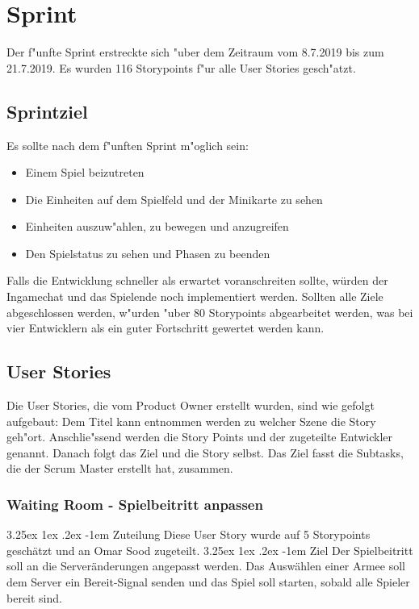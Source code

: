 \documentclass[12pt, titlepage]{scrartcl}
\makeatletter
\newcommand{\RN}[1]{%
	\textup{\uppercase\expandafter{\romannumeral#1}}%
}
\renewcommand\paragraph{\@startsection{paragraph}{5}{\z@}%
  {3.25ex \@plus1ex \@minus.2ex}%
  {-1em}%
  {\normalfont\normalsize\bfseries}}
\makeatother
\begin{document}
	\section{Sprint \RN{5}}
	    Der f"unfte Sprint erstreckte sich "uber dem Zeitraum vom 8.7.2019 bis zum 21.7.2019. Es wurden 116 Storypoints f"ur alle User Stories gesch"atzt.
	    \subsection{Sprintziel} \label{Sprintgoal_5}
	        Es sollte nach dem f"unften Sprint m"oglich sein:
	        \begin{itemize}
	            \item Einem Spiel beizutreten
	            \item Die Einheiten auf dem Spielfeld und der Minikarte zu sehen
	            \item Einheiten auszuw"ahlen, zu bewegen und anzugreifen
	            \item Den Spielstatus zu sehen und Phasen zu beenden
	        \end{itemize}
	        Falls die Entwicklung schneller als erwartet voranschreiten sollte, würden der Ingamechat und das Spielende noch implementiert werden. Sollten alle Ziele abgeschlossen werden, w"urden "uber 80 Storypoints abgearbeitet werden, was bei vier Entwicklern als ein guter Fortschritt gewertet werden kann.
	    \subsection{User Stories} \label{User_Stories_5}
	        Die User Stories, die vom Product Owner erstellt wurden, sind wie gefolgt aufgebaut: Dem Titel kann entnommen werden zu welcher Szene die Story geh"ort. Anschlie"ssend werden die Story Points und der zugeteilte Entwickler genannt. Danach folgt das Ziel und die Story selbst. Das Ziel fasst die Subtasks, die der Scrum Master erstellt hat, zusammen.
	        \subsubsection{Waiting Room - Spielbeitritt anpassen}
	            \paragraph{Zuteilung}
	                Diese User Story wurde auf 5 Storypoints gesch\"atzt und an Omar Sood zugeteilt.
	            \paragraph{Ziel}
	                Der Spielbeitritt soll an die Server\"anderungen angepasst werden. Das Ausw\"ahlen einer Armee soll dem Server ein Bereit-Signal senden und das Spiel soll starten, sobald alle Spieler bereit sind.
\end{document}
